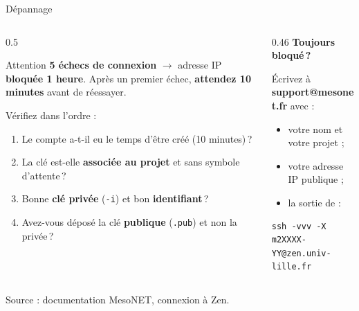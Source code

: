 \documentclass[8pt,aspectratio=169]{beamer}
\newcommand{\src}[1]{\vfill{\tiny\color{gray}Source : #1\par}}
\begin{document}
\begin{frame}[fragile]{Dépannage}
\begin{columns}[T]
\begin{column}{0.5\textwidth}
\begin{alertblock}{Attention}
\textbf{5 échecs de connexion} $\to$ adresse IP \textbf{bloquée 1 heure}. Après un premier échec, \textbf{attendez 10 minutes} avant de réessayer.
\end{alertblock}

Vérifiez dans l'ordre :
\begin{enumerate}
\item Le compte a-t-il eu le temps d'être créé (10 minutes)\,?
\item La clé est-elle \textbf{associée au projet} et sans symbole d'attente\,?
\item Bonne \textbf{clé privée} (\texttt{-i}) et bon \textbf{identifiant}\,?
\item Avez-vous déposé la clé \textbf{publique} (\texttt{.pub}) et non la privée\,?
\end{enumerate}
\end{column}
\begin{column}{0.46\textwidth}
\textbf{Toujours bloqué\,?}

\smallskip
Écrivez à \textbf{support@mesonet.fr} avec :
\begin{itemize}
\item votre nom et votre projet ;
\item votre adresse IP publique ;
\item la sortie de :
\end{itemize}
\begin{verbatim}
ssh -vvv -X m2XXXX-YY@zen.univ-lille.fr
\end{verbatim}
\end{column}
\end{columns}
\src{documentation MesoNET, \og connexion \fg{} à Zen.}
\end{frame}
\end{document}
